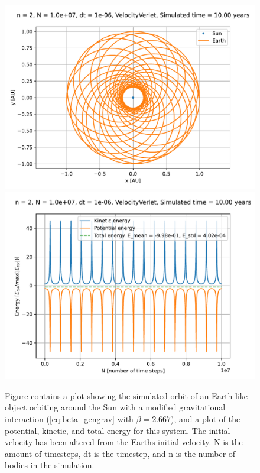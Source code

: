 \documentclass[reprint,english,notitlepage]{revtex4-1}  %
\begin{document}
\begin{figure}[H]
\includegraphics[scale=0.5]{../data/figures/varyingbeta/se_peturbed_beta2667_vv_orbits2D.pdf}
\includegraphics[scale=0.5]{../data/figures/varyingbeta/se_peturbed_beta2667_vv_energy.pdf}
\caption{Figure contains a plot showing the simulated orbit of an Earth-like object orbiting around the Sun with a modified gravitational interaction (\eqref{eq:beta_gengrav} with $\beta = 2.667$), and a plot of the potential, kinetic, and total energy for this system. The initial velocity has been altered from the Earths initial velocity. N is the amount of timesteps, dt is the timestep, and n is the number of bodies in the simulation.}
\label{fig:beta2667_peturbed}
\end{figure}
\end{document}
